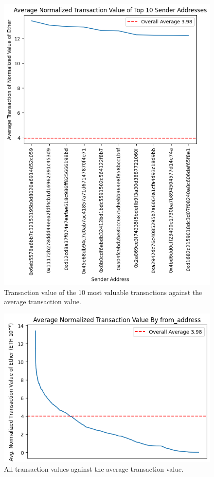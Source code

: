 \documentclass[sigconf]{acmart}
\begin{document}
\begin{figure}[H]
    \centering
    \includegraphics[width=0.8\linewidth]{M6-transaction-value-top10.png}
    \caption{Transaction value of the 10 most valuable transactions against the average transaction value.}
    \label{fig:transactionTop10}
\end{figure}

\begin{figure}[H]
    \centering
    \includegraphics[width=0.8\linewidth]{M6-transaction-value-normalized.png}
    \caption{All transaction values against the average transaction value.}
    \label{fig:transactionAll}
\end{figure}
\end{document}
